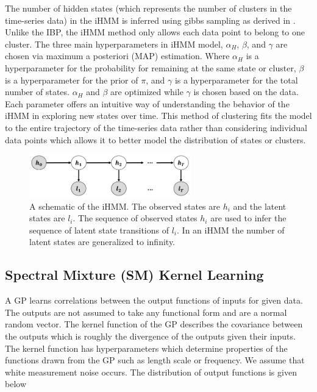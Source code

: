 \documentclass{article}
\begin{document}
The number of hidden states (which represents the number of clusters in the time-series data) in the iHMM is inferred using gibbs sampling as derived in \cite{iHMMBeal}. Unlike the IBP, the iHMM method only allows each data point to belong to one cluster. The three main hyperparameters in iHMM model, $\alpha_H$, $\beta$, and $\gamma$ are chosen via maximum a posteriori (MAP) estimation. Where $\alpha_H$ is a hyperparameter for the probability for remaining at the same state or cluster, $\beta$ is a hyperparameter for the prior of $\pi$, and $\gamma$ is a hyperparameter for the total number of states. $\alpha_H$ and $\beta$ are optimized while $\gamma$ is chosen based on the data. Each parameter offers an intuitive way of understanding the behavior of the iHMM in exploring new states over time. This method of clustering fits the model to the entire trajectory of the time-series data rather than considering individual data points which allows it to better model the distribution of states or clusters.



\begin{figure}[ht]
\vskip 0.2in
\begin{center}
\centerline{\includegraphics[width=70mm]{iHMM2}}
\caption{A schematic of the iHMM. The observed states are $h_{i}$ and the latent states are $l_{i}$. The sequence of observed states $h_{i}$ are used to infer the sequence of latent state transitions of $l_{i}$. In an iHMM the number of latent states are generalized to infinity.}
\label{iHMM2}
\end{center}
\vskip -0.2in
\end{figure} 

\subsection{Spectral Mixture (SM) Kernel Learning}

 A GP learns correlations between the output functions of inputs for given data. The outputs are not assumed to take any functional form and are a normal random vector. The kernel function of the GP describes the covariance between the outputs which is roughly the divergence of the outputs given their inputs. The kernel function has hyperparameters which determine properties of the functions drawn from the GP such as length scale or frequency. We assume that white measurement noise occurs. The distribution of output functions is given below \cite{GPML}
\end{document}
